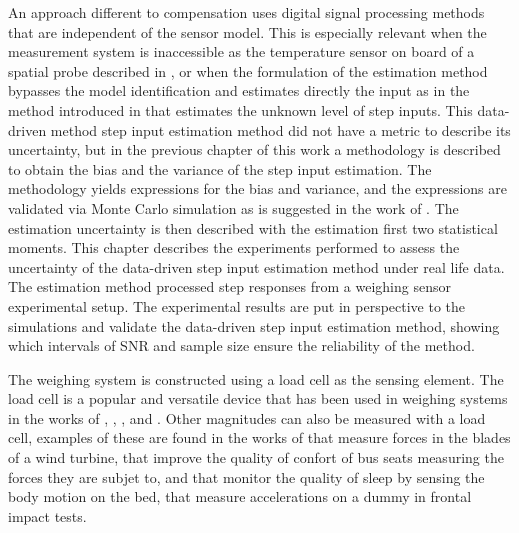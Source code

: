 An approach different to compensation uses digital signal processing methods that are independent of the sensor model.
\color{blue} This is especially relevant when the measurement system is inaccessible as the temperature sensor on board of a spatial probe described in \citet{Saggin01}, or when the formulation of the estimation method bypasses the model identification and estimates directly the input as in the method introduced in \citet{Markovsky15cep} that estimates the unknown level of step inputs. 
This data-driven method step input estimation method did not have a metric to describe its uncertainty, but in the previous chapter of this work a methodology is described to obtain the bias and the variance of the step input estimation.
The methodology yields expressions for the bias and variance, and the expressions are validated via Monte Carlo simulation as is suggested in the work of \citet{Cox06}. 
The estimation uncertainty is then described with the estimation first two statistical moments.
This chapter describes the experiments performed to assess the uncertainty of the data-driven step input estimation method under real life data. 
The estimation method processed step responses from a  weighing sensor experimental setup. 
The experimental results are put in perspective to the simulations and validate the data-driven step input estimation method, showing which intervals of SNR and sample size ensure the reliability of the method.

The weighing system is constructed using a load cell as the sensing element.
The load cell is a popular and versatile device that has been used in weighing systems in the works of \citet{Piskorowski08}, \citet{Boschetti13}, \citet{Kesilmis16}, and \citet{Guo18}.
Other magnitudes can also be measured with a load cell, examples of these are found in the works of \citet{Rossander15} that measure forces in the blades of a wind turbine, \citet{Hernandez06} that improve the quality of confort of bus seats measuring the forces they are subjet to, \citet{Alaziz17} and \citet{Zahradka18} that monitor the quality of sleep by sensing the body motion on the bed, \citet{Ballo16} that measure accelerations on a dummy in frontal impact tests. 


\color{black}




